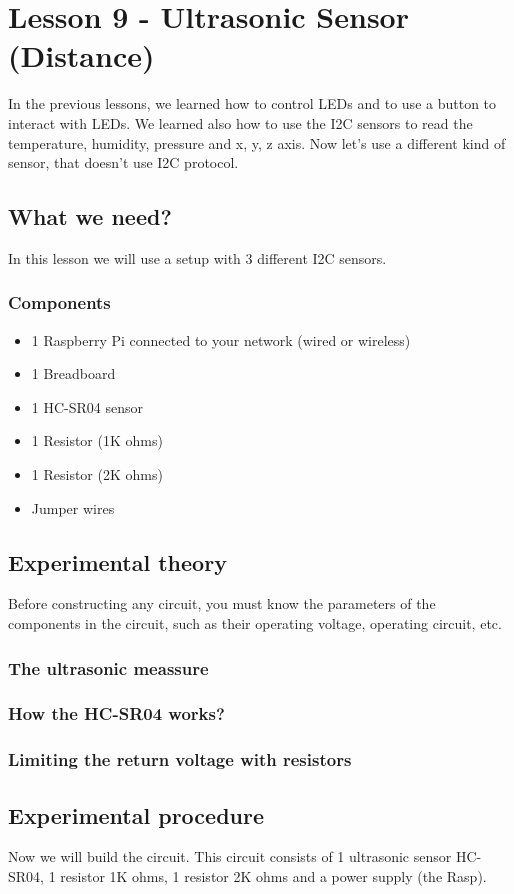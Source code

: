 \documentclass[10pt,twoside,english]{_support/latex/sbabook/sbabook}
\begin{document}
\frontmatter
\pagestyle{plain}

\tableofcontents*
\clearpage\listoffigures

\mainmatter

\chapter{Lesson 9 - Ultrasonic Sensor (Distance)}
In the previous lessons, we learned how to control LEDs and to use a button to interact with LEDs. We learned also how to use the I2C sensors to read the temperature, humidity, pressure and x, y, z axis. Now let's use a different kind of sensor, that doesn't use I2C protocol. 
\section{What we need?}
In this lesson we will use a setup with 3 different I2C sensors.
\subsection{Components}
\begin{itemize}
\item 1 Raspberry Pi connected to your network (wired or wireless)
\item 1 Breadboard
\item 1 HC-SR04 sensor
\item 1 Resistor (1K ohms)
\item 1 Resistor (2K ohms)
\item Jumper wires
\end{itemize}
\section{Experimental theory}
Before constructing any circuit, you must know the parameters of the components in the circuit, such as their operating voltage, operating circuit, etc.
\subsection{The ultrasonic meassure}\subsection{How the HC-SR04 works?}\subsection{Limiting the return voltage with resistors}\section{Experimental procedure}
Now we will build the circuit. This circuit consists of 1 ultrasonic sensor HC-SR04, 1 resistor 1K ohms, 1 resistor 2K ohms and a power supply (the Rasp).
\end{document}
